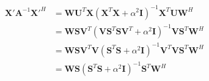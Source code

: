 \documentclass[10pt]{article}
\begin{document}
\begin{align*}\begin{split}
\boldsymbol X' \boldsymbol A^{-1} \boldsymbol X'^H &=
  \boldsymbol W \boldsymbol U^T \boldsymbol X \left(\boldsymbol X^T \boldsymbol X + \alpha^2 \boldsymbol I \right)^{-1}
   \boldsymbol X^T \boldsymbol U \boldsymbol W^H \\
  &= \boldsymbol W \boldsymbol S \boldsymbol V^T 
\left( \boldsymbol V \boldsymbol S^T \boldsymbol S \boldsymbol V^T + \alpha^2 \boldsymbol I \right)^{-1}
\boldsymbol V \boldsymbol S^T \boldsymbol W^H \\
&= \boldsymbol W \boldsymbol S \boldsymbol V^T 
\boldsymbol V \left( \boldsymbol S^T \boldsymbol S + \alpha^2 \boldsymbol I \right)^{-1}
\boldsymbol V^T \boldsymbol V\boldsymbol S^T \boldsymbol W^H \\
&= \boldsymbol W \boldsymbol S 
\left( \boldsymbol S^T \boldsymbol S + \alpha^2 \boldsymbol I \right)^{-1}
\boldsymbol S^T \boldsymbol W^H \\
\end{split}\end{align*}
\end{document}
